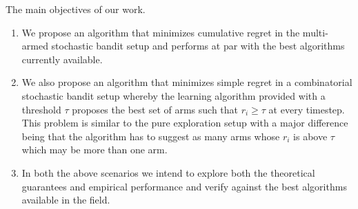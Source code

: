 The main objectives of our work.
\begin{enumerate}
\item We propose an algorithm that minimizes cumulative regret in the multi-armed stochastic bandit setup  and performs at par with the best algorithms currently available.
\item We also propose an algorithm that minimizes simple regret in a combinatorial stochastic bandit setup whereby the learning algorithm provided with a threshold $\tau$ proposes the best set of arms such that $r_{i}\geq \tau$ at every timestep. This problem is similar to the pure exploration setup with a major difference being that the algorithm has to suggest as many arms whose $r_{i}$ is above $\tau$ which may be more than one arm.
\item In both the above scenarios we intend to explore both the theoretical guarantees and empirical performance and verify against the best algorithms available in the field.     
\end{enumerate}